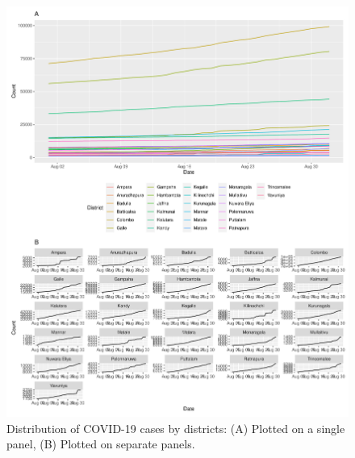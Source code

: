 \documentclass[
]{article}
\begin{document}
\begin{figure}
\centering
\includegraphics{manuscript_covid19dashboard_files/figure-latex/unnamed-chunk-2-1.pdf}
\caption{Distribution of COVID-19 cases by districts: (A) Plotted on a
single panel, (B) Plotted on separate panels.}
\end{figure}
\end{document}
